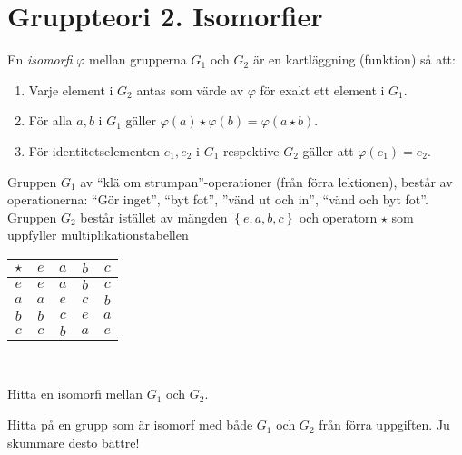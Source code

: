 \documentclass[11pt,fleqn]{book} %
\begin{document}
  \renewcommand*\rmdefault{ppl}\normalfont\upshape

\chapter{Gruppteori 2. Isomorfier}
\large
\thispagestyle{empty}

\begin{definition} En \textit{isomorfi} \(\varphi \) mellan grupperna \(G_1\) och \(G_2\) är en kartläggning (funktion) så att:
  \begin{enumerate} %
    \item Varje element i \(G_2\) antas som värde av \(\varphi\) för exakt ett element i \(G_1\).
    \item För alla \(a, b\) i \(G_1\) gäller \(\varphi(a) \star \varphi (b) = \varphi(a  \star b)\).
    \item För identitetselementen \(e_1, e_2\) i \(G_1\) respektive \(G_2\) gäller att \(\varphi(e_1) = e_2\).
  \end{enumerate}
\end{definition}

\begin{problem}
  Gruppen \(G_1\) av ``klä om strumpan''-operationer (från förra lektionen), består av operationerna: ``Gör inget'', ``byt fot'', ''vänd ut och in'', ``vänd och byt fot''. Gruppen \(G_2\) består istället av mängden \(\left\{e, a, b, c\right\}\) och operatorn \(\star\) som uppfyller multiplikationstabellen 
  { \center
  \begin{tabular}{c|cccc}
    \( \star \) & \(e\) & \(a\) & \(b\) & \(c\)  \\ \midrule
    \(e\) & \(e\) & \(a\) & \(b\) & \(c\)  \\
    \(a\) & \(a\) & \(e\) & \(c\) & \(b\) \\
    \(b\) & \(b\) & \(c\) & \(e\) & \(a\) \\
    \(c\) & \(c\) & \(b\) & \(a\) & \(e\) \\
  \end{tabular}\\}
  \vspace{2ex}
  \noindent Hitta en isomorfi mellan \(G_1\) och \(G_2\).
\end{problem}

\begin{problem}
  Hitta på en grupp som är isomorf med både \(G_1\) och \(G_2\) från förra uppgiften. Ju skummare desto bättre!
\end{problem}
\end{document}
